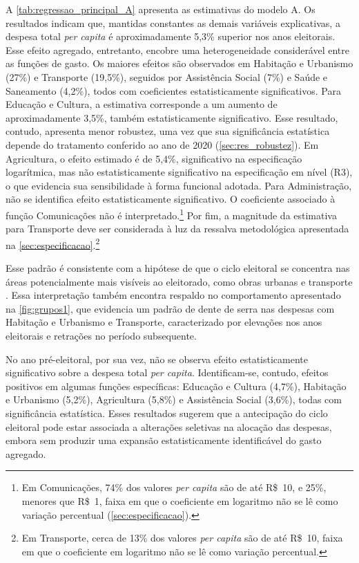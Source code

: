A \autoref{tab:regressao_principal_A} apresenta as estimativas do modelo A. Os resultados indicam que, mantidas constantes as demais variáveis explicativas, a despesa total \textit{per capita} é aproximadamente 5,3\% superior nos anos eleitorais. Esse efeito agregado, entretanto, encobre uma heterogeneidade considerável entre as funções de gasto. Os maiores efeitos são observados em Habitação e Urbanismo (27\%) e Transporte (19,5\%), seguidos por Assistência Social (7\%) e Saúde e Saneamento (4,2\%), todos com coeficientes estatisticamente significativos. Para Educação e Cultura, a estimativa corresponde a um aumento de aproximadamente 3,5\%, também estatisticamente significativo. Esse resultado, contudo, apresenta menor robustez, uma vez que sua significância estatística depende do tratamento conferido ao ano de 2020 (\autoref{sec:res_robustez}). Em Agricultura, o efeito estimado é de 5,4\%, significativo na especificação logarítmica, mas não estatisticamente significativo na especificação em nível (R3), o que evidencia sua sensibilidade à forma funcional adotada. Para Administração, não se identifica efeito estatisticamente significativo. O coeficiente associado à função Comunicações não é interpretado.\footnote{Em Comunicações, 74\% dos valores \textit{per capita} são de até R\$~10, e 25\%, menores que R\$~1, faixa em que o coeficiente em logaritmo não se lê como variação percentual (\autoref{sec:especificacao}).} Por fim, a magnitude da estimativa para Transporte deve ser considerada à luz da ressalva metodológica apresentada na \autoref{sec:especificacao}.\footnote{Em Transporte, cerca de 13\% dos valores \textit{per capita} são de até R\$~10, faixa em que o coeficiente em logaritmo não se lê como variação percentual.}

Esse padrão é consistente com a hipótese de que o ciclo eleitoral se concentra nas áreas potencialmente mais visíveis ao eleitorado, como obras urbanas e transporte \parencite{drazen2010}. Essa interpretação também encontra respaldo no comportamento apresentado na \autoref{fig:grupos1}, que evidencia um padrão de dente de serra nas despesas com Habitação e Urbanismo e Transporte, caracterizado por elevações nos anos eleitorais e retrações no período subsequente.

No ano pré-eleitoral, por sua vez, não se observa efeito estatisticamente significativo sobre a despesa total \textit{per capita}. Identificam-se, contudo, efeitos positivos em algumas funções específicas: Educação e Cultura (4,7\%), Habitação e Urbanismo (5,2\%), Agricultura (5,8\%) e Assistência Social (3,6\%), todas com significância estatística. Esses resultados sugerem que a antecipação do ciclo eleitoral pode estar associada a alterações seletivas na alocação das despesas, embora sem produzir uma expansão estatisticamente identificável do gasto agregado.

